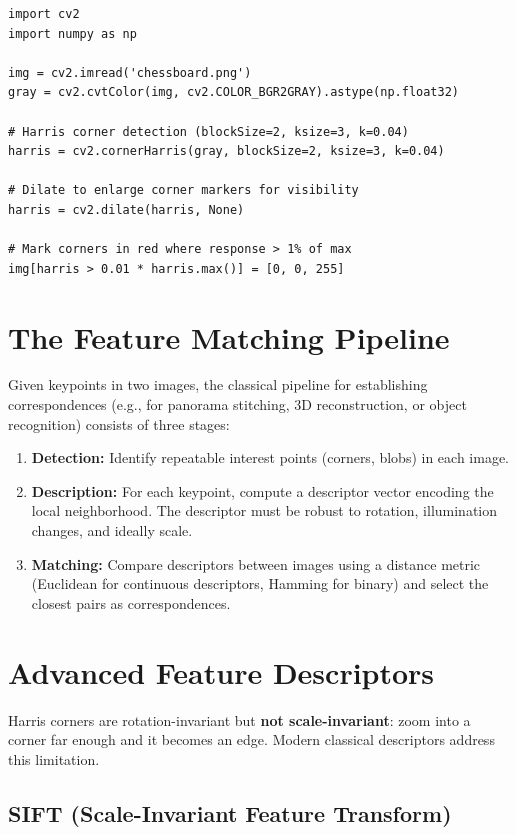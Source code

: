 \begin{lstlisting}[style=pythonstyle]
import cv2
import numpy as np

img = cv2.imread('chessboard.png')
gray = cv2.cvtColor(img, cv2.COLOR_BGR2GRAY).astype(np.float32)

# Harris corner detection (blockSize=2, ksize=3, k=0.04)
harris = cv2.cornerHarris(gray, blockSize=2, ksize=3, k=0.04)

# Dilate to enlarge corner markers for visibility
harris = cv2.dilate(harris, None)

# Mark corners in red where response > 1% of max
img[harris > 0.01 * harris.max()] = [0, 0, 255]
\end{lstlisting}

\section*{The Feature Matching Pipeline}

Given keypoints in two images, the classical pipeline for establishing correspondences (e.g., for panorama stitching, 3D reconstruction, or object recognition) consists of three stages:

\begin{enumerate}
    \item \textbf{Detection:} Identify repeatable interest points (corners, blobs) in each image.
    \item \textbf{Description:} For each keypoint, compute a descriptor vector encoding the local neighborhood. The descriptor must be robust to rotation, illumination changes, and ideally scale.
    \item \textbf{Matching:} Compare descriptors between images using a distance metric (Euclidean for continuous descriptors, Hamming for binary) and select the closest pairs as correspondences.
\end{enumerate}

\section*{Advanced Feature Descriptors}

Harris corners are rotation-invariant but \textbf{not scale-invariant}: zoom into a corner far enough and it becomes an edge. Modern classical descriptors address this limitation.

\subsection*{SIFT (Scale-Invariant Feature Transform)}

